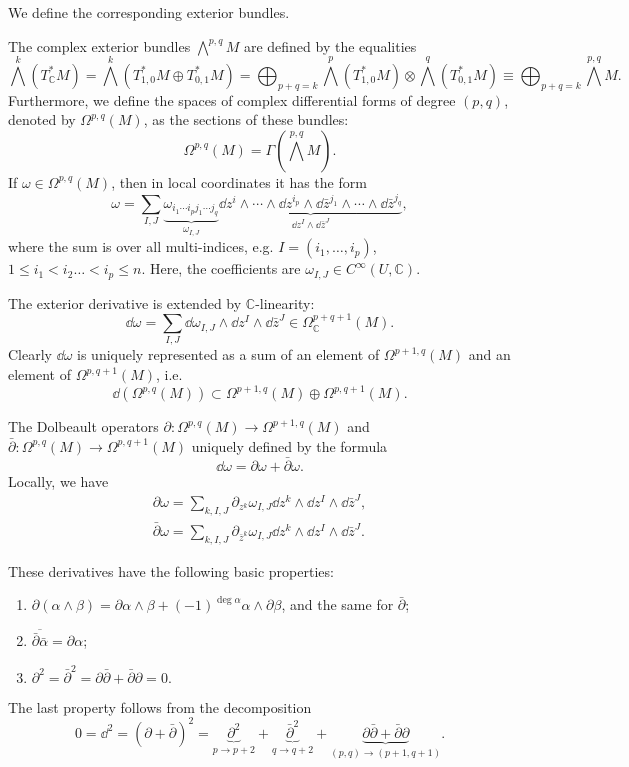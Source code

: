 We define the corresponding exterior bundles.

\begin{defn}
    The complex exterior bundles $\bigwedge^{p,q}M$ are defined by the equalities \[\bigwedge^k(T^\ast_\mathbb{C}M)=\bigwedge^k(T^\ast_{1,0}M\oplus T^\ast_{0,1}M)=\bigoplus_{p+q=k}\bigwedge^p(T^\ast_{1,0}M)\otimes \bigwedge^q(T^\ast_{0,1}M)\equiv \bigoplus_{p+q=k}\bigwedge^{p,q}M.\]
    Furthermore, we define the spaces of complex differential forms of degree $(p,q)$, denoted by $\Omega^{p,q}(M)$, as the sections of these bundles:
    \[\Omega^{p,q}(M)=\Gamma(\bigwedge^{p,q}M).\]
    If $\omega\in\Omega^{p,q}(M)$, then in local coordinates it has the form
    \[\omega=\sum_{I,J}\underbrace{\omega_{i_1\cdots i_pj_1\cdots j_q}}_{\omega_{I,J}}\underbrace{\dd z^i\wedge\cdots\wedge \dd z^{i_p}\wedge\dd \bar z^{j_1}\wedge\cdots\wedge \dd\bar z^{j_q}}_{\dd z^I\wedge \dd\bar z^J},\]
    where the sum is over all multi-indices, e.g. $I=(i_1,\ldots,i_p)$, $1\leq i_1<i_2\ldots<i_p\leq n$. Here, the coefficients are $\omega_{I,J}\in C^\infty (U,\mathbb{C})$.
\end{defn}

 The exterior derivative is extended by $\mathbb{C}$-linearity:
    \[\dd \omega=\sum_{I,J}\dd\omega_{I,J}\wedge\dd z^I\wedge\dd \bar z^J\in\Omega^{p+q+1}_\mathbb{C}(M).\]
Clearly $\dd\omega$ is uniquely represented as a sum of an element of $\Omega^{p+1,q}(M)$ and an element of $\Omega^{p,q+1}(M)$, i.e.
\[\dd(\Omega^{p,q}(M))\subset \Omega^{p+1,q}(M)\oplus\Omega^{p,q+1}(M).\]

\begin{defn}
    The Dolbeault operators $\partial:\Omega^{p,q}(M)\to\Omega^{p+1,q}(M)$ and $\bar\partial:\Omega^{p,q}(M)\to\Omega^{p,q+1}(M)$ uniquely defined by the formula
    \[\dd\omega=\partial\omega+\bar\partial\omega.\]
    Locally, we have 
    \begin{align}
        \partial\omega=\sum_{k,I,J}\partial_{z^k}\omega_{I,J}\dd z^k\wedge\dd z^I\wedge \dd\bar z^J,\\
        \bar\partial\omega=\sum_{k,I,J}\partial_{\bar z^k}\omega_{I,J}\dd z^k\wedge\dd z^I\wedge \dd\bar z^J.
    \end{align}
\end{defn}

These derivatives have the following basic properties:
\begin{enumerate}
    \item $\partial(\alpha\wedge\beta)=\partial\alpha\wedge\beta+(-1)^{\deg\alpha}\alpha\wedge\partial\beta$, and the same for $\bar\partial$;
    \item $\overline{\bar\partial\bar\alpha}=\partial\alpha$;
    \item $\partial^2=\bar\partial^2=\partial\bar\partial+\bar\partial\partial=0.$
\end{enumerate}
The last property follows from the decomposition \[0=\dd^2=(\partial+\bar\partial)^2=\underbrace{\partial^2}_{p\to p+2}+\underbrace{\bar\partial^2}_{q\to q+2}+\underbrace{\partial\bar\partial+\bar\partial\partial}_{(p,q)\to(p+1,q+1)}.\]



